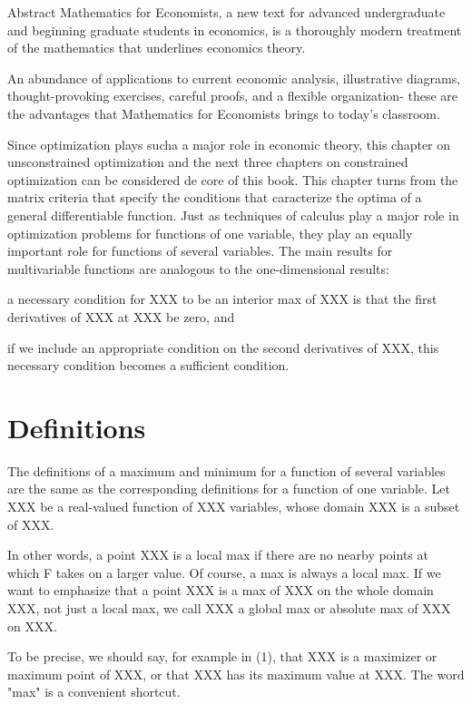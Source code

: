 Abstract
Mathematics for Economists, a new text for advanced undergraduate and beginning 
graduate students in economics, is a thoroughly modern treatment of the 
mathematics that underlines economics theory.

An abundance of applications to current economic analysis, illustrative 
diagrams, thought-provoking exercises, careful proofs, and a flexible 
organization- these are the advantages that Mathematics for Economists 
brings to today's classroom.

Since optimization plays sucha a major role in economic theory, this chapter on
unsconstrained optimization and the next three chapters on constrained 
optimization can be considered de core of this book. This chapter turns from the
matrix criteria that specify the conditions that caracterize the optima of a 
general differentiable function. Just as techniques of calculus play a major 
role in optimization problems for functions of one variable, they play an 
equally important role for functions of several variables. The main results for
multivariable functions are analogous to the one-dimensional results:

a necessary condition for XXX to be an interior max of XXX is that the first 
derivatives of XXX at XXX be zero, and

if we include an appropriate condition on the second derivatives of XXX, this 
necessary condition becomes a sufficient condition.


\section{Definitions}

The definitions of a maximum and minimum for a function of several variables 
are the same as the corresponding definitions for a function of one variable. 
Let XXX be a real-valued function of XXX variables, whose domain XXX is a 
subset of XXX.



In other words, a point XXX is a local max if there are no nearby points at 
which F takes on a larger value. Of course, a max is always a local max. If we 
want to emphasize that a point XXX is a max of XXX on the whole domain XXX, not 
just a local max, we call XXX a global max or absolute max of XXX on XXX.

To be precise, we should say, for example in (1), that XXX is a maximizer or 
maximum point of XXX, or that XXX has its maximum value at XXX. The word "max" 
is a convenient shortcut. 


